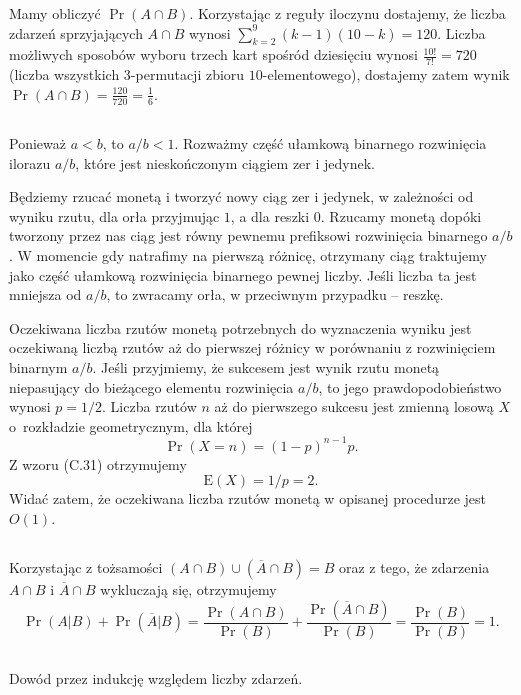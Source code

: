 Mamy obliczyć $\Pr(A\cap B)$. Korzystając z reguły iloczynu dostajemy, że liczba zdarzeń sprzyjających $A\cap B$ wynosi $\sum_{k=2}^9(k-1)(10-k)=120$. Liczba możliwych sposobów wyboru trzech kart spośród dziesięciu wynosi $\frac{10!}{7!}=720$ (liczba wszystkich $3$-permutacji zbioru $10$-elementowego), dostajemy zatem wynik $\Pr(A\cap B)=\frac{120}{720}=\frac{1}{6}$.

\subsection{} %
Ponieważ $a<b$, to $a/b<1$. Rozważmy część ułamkową binarnego rozwinięcia ilorazu $a/b$, które jest nieskończonym ciągiem zer i jedynek.

Będziemy rzucać monetą i tworzyć nowy ciąg zer i jedynek, w zależności od wyniku rzutu, dla orła przyjmując $1$, a dla reszki $0$. Rzucamy monetą dopóki tworzony przez nas ciąg jest równy pewnemu prefiksowi rozwinięcia binarnego $a/b$. W momencie gdy natrafimy na pierwszą różnicę, otrzymany ciąg traktujemy jako część ułamkową rozwinięcia binarnego pewnej liczby. Jeśli liczba ta jest mniejsza od $a/b$, to zwracamy orła, w przeciwnym przypadku -- reszkę.

Oczekiwana liczba rzutów monetą potrzebnych do wyznaczenia wyniku jest oczekiwaną liczbą rzutów aż do pierwszej różnicy w porównaniu z rozwinięciem binarnym $a/b$. Jeśli przyjmiemy, że sukcesem jest wynik rzutu monetą niepasujący do bieżącego elementu rozwinięcia $a/b$, to jego prawdopodobieństwo wynosi $p=1/2$. Liczba rzutów $n$ aż do pierwszego sukcesu jest zmienną losową $X$ o~rozkładzie geometrycznym, dla której
\[
	\Pr(X=n) = (1-p)^{n-1}p.
\]
Z wzoru (C.31) otrzymujemy
\[
	\mathrm{E}(X) = 1/p = 2.
\]
Widać zatem, że oczekiwana liczba rzutów monetą w opisanej procedurze jest $O(1)$.

\subsection{} %
Korzystając z tożsamości $(A\cap B)\cup \left(\overline{A}\cap B\right)=B$ oraz z tego, że zdarzenia $A\cap B$ i $\overline{A}\cap B$ wykluczają się, otrzymujemy
\[
	\Pr(A|B)+\Pr\left(\overline{A}|B\right) = \frac{\Pr(A\cap B)}{\Pr(B)} + \frac{\Pr\left(\overline{A}\cap B\right)}{\Pr(B)} = \frac{\Pr(B)}{\Pr(B)} = 1.
\]

\subsection{} %
Dowód przez indukcję względem liczby zdarzeń.

